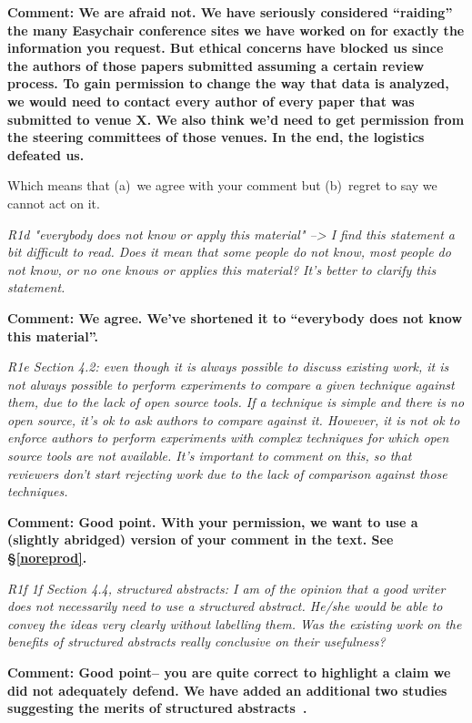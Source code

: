 \documentclass[preprint,10pt]{elsarticle}
\begin{document}
{\bf Comment: We are afraid not.  We have seriously considered ``raiding'' the many Easychair conference sites we have worked on for exactly the information you request. But ethical concerns have blocked us since the authors of those papers submitted assuming a certain review process. To gain permission to change the way that data is analyzed,  we would need to contact every author of every paper that was submitted to venue X. We also think we'd need to get permission from the steering committees of those venues. In the end, the logistics defeated us. 

Which means that (a)~we agree with your comment but (b)~regret to say we cannot act on it.}

{\em R1d "everybody does not know or apply this material" --> I find this statement a bit difficult to read. Does it mean that some people do not know, most people do not know, or no one knows or applies this material? It's better to clarify this statement.}

{\bf Comment: We agree. We've shortened it to ``everybody does not know  this material''.
}

{\em R1e Section 4.2: even though it is always possible to discuss existing work, it is not always possible to perform experiments to compare a given technique against them, due to the lack of open source tools. If a technique is simple and there is no open source, it's ok to ask authors to compare against it. However, it is not ok to enforce authors to perform experiments with complex techniques for which open source tools are not available. It's important to comment on this, so that reviewers don't start rejecting work due to the lack of comparison against those techniques. }

{\bf Comment: Good point.  With your permission, we want to use a (slightly abridged) version of your comment in the text.
See \S\vref{noreprod}.
}

{\em R1f  1f Section 4.4, structured abstracts: I am of the opinion that a good writer does not necessarily need to use a structured abstract. He/she would be able to convey the ideas very clearly without labelling them. Was the existing work on the benefits of structured abstracts really conclusive on their usefulness?}

{\bf Comment: Good point-- you are quite correct to highlight a claim we did not adequately defend.  We have added an additional two studies suggesting the merits of structured abstracts~\cite{4460893,booth1997value}.}
\end{document}
